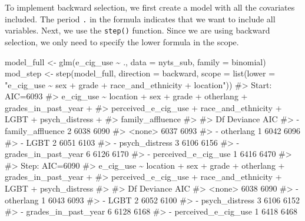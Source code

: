 \documentclass[
  letterpaper,
]{latex/krantz}
\makeatletter
\newenvironment{Shaded}{\begin{snugshade}}{\end{snugshade}}
\newcommand{\AttributeTok}[1]{\textcolor[rgb]{0.40,0.45,0.13}{#1}}
\newcommand{\CommentTok}[1]{\textcolor[rgb]{0.37,0.37,0.37}{#1}}
\newcommand{\FunctionTok}[1]{\textcolor[rgb]{0.28,0.35,0.67}{#1}}
\newcommand{\NormalTok}[1]{\textcolor[rgb]{0.00,0.23,0.31}{#1}}
\newcommand{\OtherTok}[1]{\textcolor[rgb]{0.00,0.23,0.31}{#1}}
\newcommand{\SpecialCharTok}[1]{\textcolor[rgb]{0.37,0.37,0.37}{#1}}
\newcommand{\StringTok}[1]{\textcolor[rgb]{0.13,0.47,0.30}{#1}}
\newenvironment{kframe}{%
\medskip{}
\setlength{\fboxsep}{.8em}
 \def\at@end@of@kframe{}%
 \ifinner\ifhmode%
  \def\at@end@of@kframe{\end{minipage}}%
  \begin{minipage}{\columnwidth}%
 \fi\fi%
 \def\FrameCommand##1{\hskip\@totalleftmargin \hskip-\fboxsep
 \colorbox{shadecolor}{##1}\hskip-\fboxsep
     \hskip-\linewidth \hskip-\@totalleftmargin \hskip\columnwidth}%
 \MakeFramed {\advance\hsize-\width
   \@totalleftmargin\z@ \linewidth\hsize
   \@setminipage}}%
 {\par\unskip\endMakeFramed%
 \at@end@of@kframe}
\renewenvironment{Shaded}{\begin{kframe}}{\end{kframe}}
\makeatother
\begin{document}
To implement backward selection, we first create a model with all the
covariates included. The period \texttt{.} in the formula indicates that
we want to include all variables. Next, we use the \texttt{step()}
function. Since we are using backward selection, we only need to specify
the lower formula in the scope.

\begin{Shaded}
\begin{Highlighting}[]
\NormalTok{model\_full }\OtherTok{\textless{}{-}} \FunctionTok{glm}\NormalTok{(e\_cig\_use }\SpecialCharTok{\textasciitilde{}}\NormalTok{ ., }\AttributeTok{data =}\NormalTok{ nyts\_sub, }\AttributeTok{family =}\NormalTok{ binomial)}
\NormalTok{mod\_step }\OtherTok{\textless{}{-}} \FunctionTok{step}\NormalTok{(model\_full, }\AttributeTok{direction =} \StringTok{\textquotesingle{}backward\textquotesingle{}}\NormalTok{, }
                 \AttributeTok{scope =} \FunctionTok{list}\NormalTok{(}\AttributeTok{lower =} \StringTok{"e\_cig\_use \textasciitilde{} sex + grade + }
\StringTok{                 race\_and\_ethnicity + location"}\NormalTok{))}
\CommentTok{\#\textgreater{} Start:  AIC=6093}
\CommentTok{\#\textgreater{} e\_cig\_use \textasciitilde{} location + sex + grade + otherlang + grades\_in\_past\_year + }
\CommentTok{\#\textgreater{}     perceived\_e\_cig\_use + race\_and\_ethnicity + LGBT + psych\_distress + }
\CommentTok{\#\textgreater{}     family\_affluence}
\CommentTok{\#\textgreater{} }
\CommentTok{\#\textgreater{}                       Df Deviance  AIC}
\CommentTok{\#\textgreater{} {-} family\_affluence     2     6038 6090}
\CommentTok{\#\textgreater{} \textless{}none\textgreater{}                       6037 6093}
\CommentTok{\#\textgreater{} {-} otherlang            1     6042 6096}
\CommentTok{\#\textgreater{} {-} LGBT                 2     6051 6103}
\CommentTok{\#\textgreater{} {-} psych\_distress       3     6106 6156}
\CommentTok{\#\textgreater{} {-} grades\_in\_past\_year  6     6126 6170}
\CommentTok{\#\textgreater{} {-} perceived\_e\_cig\_use  1     6416 6470}
\CommentTok{\#\textgreater{} }
\CommentTok{\#\textgreater{} Step:  AIC=6090}
\CommentTok{\#\textgreater{} e\_cig\_use \textasciitilde{} location + sex + grade + otherlang + grades\_in\_past\_year + }
\CommentTok{\#\textgreater{}     perceived\_e\_cig\_use + race\_and\_ethnicity + LGBT + psych\_distress}
\CommentTok{\#\textgreater{} }
\CommentTok{\#\textgreater{}                       Df Deviance  AIC}
\CommentTok{\#\textgreater{} \textless{}none\textgreater{}                       6038 6090}
\CommentTok{\#\textgreater{} {-} otherlang            1     6043 6093}
\CommentTok{\#\textgreater{} {-} LGBT                 2     6052 6100}
\CommentTok{\#\textgreater{} {-} psych\_distress       3     6106 6152}
\CommentTok{\#\textgreater{} {-} grades\_in\_past\_year  6     6128 6168}
\CommentTok{\#\textgreater{} {-} perceived\_e\_cig\_use  1     6418 6468}
\end{Highlighting}
\end{Shaded}
\end{document}
